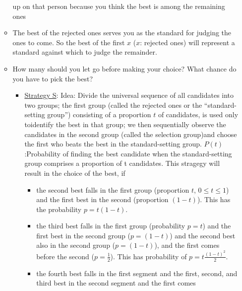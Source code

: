 \begin{example}
\begin{itemize}
\begin{itemize}
                    up on that person because you think the best is among the remaining ones
                \item The best of the rejected ones serves you as the standard for judging
                    the ones to come. So the best of the first $x$ ($x$: rejected ones) will
                    represent a standard against which to judge the remainder.
                \item How many should you let go before making your choice? What chance do you
                    have to pick the best?
                    \begin{itemize}
                        \item \underline{Strategy S}: Idea: Divide the universal sequence of
                            all candidates into two groups; the first group (called the rejected
                            ones or the “standard-setting group”) consisting of a proportion $t$
                            of candidates, is used only toidentify the best in that group; we then
                            sequentially observe the candidates in the second group (called the
                            selection group)and choose the first who beats the best in the
                            standard-setting group. $P(t)$:Probability of finding the best
                            candidate when the standard-setting group comprises a proportion
                            of t candidates. This stragegy will result in the choice of the best, if
                            \begin{itemize}
                                \item the second best falls in the first group (proportion $t$,
                                    $0 \leq t \leq 1$) and the first best in the second
                                    (proportion $(1-t)$). This has the probability $p = t (1-t)$.
                                \item the third best falls in the first group (probability $p=t$)
                                    and the first best in the second group ($p = (1-t)$) and the second
                                    best also in the second group ($p=(1-t)$), and the first comes
                                    before the second ($p=\frac{1}{2}$). This has probability of
                                    $p = t \frac{(1-t)^2}{2}$.
                                \item the fourth best falls in the first segment and the first,
                                    second, and third best in the second segment and the first comes

\end{itemize}
\end{itemize}
\end{itemize}
\end{itemize}
\end{example}
